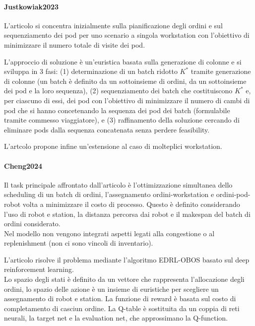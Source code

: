 \documentclass{article}
\begin{document}
\paragraph{Justkowiak2023 \cite{Justkowiak2023}}
L'articolo si concentra inizialmente sulla pianificazione degli ordini e sul sequenziamento dei pod per uno scenario a singola workstation con l'obiettivo di minimizzare il numero totale di visite dei pod. 

L'approccio di soluzione è un'euristica basata sulla generazione di colonne e si sviluppa in 3 fasi: (1) determinazione di un batch ridotto $K^*$ tramite generazione di colonne (un batch è definito da un sottoinsieme di ordini, da un sottoinsieme dei pod e la loro sequenza), (2) sequenziamento dei batch che costituiscono $K^*$ e, per ciascuno di essi, dei pod con l'obiettivo di minimizzare il numero di cambi di pod che si hanno concetenando la sequenza dei pod dei batch (formulabile tramite commesso viaggiatore), e (3) raffinamento della soluzione cercando di eliminare pods dalla sequenza concatenata senza perdere feasibility.

L'artcolo propone infine un'estensione al caso di molteplici workstation.



\paragraph{Cheng2024 \cite{Cheng2024}}
Il task principale affrontato dall'articolo è l'ottimizzazione simultanea dello scheduling di un batch di ordini, l'assegnamento ordini-workstation e ordini-pod-robot volta a minimizzare il costo di processo. Questo è definito considerando l'uso di robot e station, la distanza percorsa dai robot e il makespan del batch di ordini considerato. \\
Nel modello non vengono integrati aspetti legati alla congestione o al replenishment (non ci sono vincoli di inventario).

L'articolo risolve il problema mediante l'algoritmo EDRL-OBOS basato sul deep reinforcement learning. \\
Lo spazio degli stati è definito da un vettore che rappresenta l'allocazione degli ordini, lo spazio delle azione è un insieme di euristiche per scegliere un assegnamento di robot e station. La funzione di reward è basata sul costo di completamento di casciun ordine. La Q-table è sostituita da un coppia di reti neurali, la target net e la evaluation net, che approssimano la Q-function.
\end{document}
